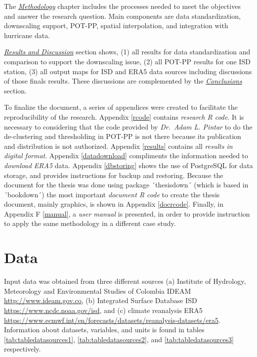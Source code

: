 \documentclass[12pt,twoside]{reedthesis}
\begin{document}
The \emph{\protect\hyperlink{rmd-method}{Methodology}} chapter includes the processes needed to meet the objectives and answer the research question. Main components are data standardization, downscaling support, POT-PP, spatial interpolation, and integration with hurricane data.

\emph{\protect\hyperlink{rmd-results}{Results and Discussion}} section shows, (1) all results for data standardization and comparison to support the downscaling issue, (2) all POT-PP results for one ISD station, (3) all output maps for ISD and ERA5 data sources including discussions of those finals results. These discussions are complemented by the \emph{\protect\hyperlink{conclusions}{Conclusions}} section.

To finalize the document, a series of appendices were created to facilitate the reproducibility of the research. Appendix \ref{rcode} contains \emph{research R code}. It is necessary to considering that the code provided by \emph{Dr.~Adam L. Pintar} to do the de-clustering and thresholding in POT-PP is not there because its publication and distribution is not authorized. Appendix \ref{results} contains all \emph{results in digital format}. Appendix \ref{datadownload} compliments the information needed to \emph{download ERA5} data. Appendix \ref{dbstoring} shows the use of PostgreSQL for data storage, and provides instructions for backup and restoring. Because the document for the thesis was done using package ´thesisdown´ (which is based in ´bookdown´) the most important \emph{document R code} to create the thesis document, mainly graphics, is shown in Appendix \ref{docrcode}. Finally, in Appendix F \ref{manual}, a \emph{user manual} is presented, in order to provide instruction to apply the same methodology in a different case study.

\hypertarget{rmd-data}{%
\chapter{Data}\label{rmd-data}}

Input data was obtained from three different sources (a) Institute of Hydrology, Meteorology and Environmental Studies of Colombia IDEAM \url{http://www.ideam.gov.co}, (b) Integrated Surface Database ISD \url{https://www.ncdc.noaa.gov/isd}, and (c) climate reanalysis ERA5 \url{https://www.ecmwf.int/en/forecasts/datasets/reanalysis-datasets/era5}. Information about datasets, variables, and units is found in tables \ref{tab:tabledatasources1}, \ref{tab:tabledatasources2}, and \ref{tab:tabledatasources3} respectively.
\end{document}
